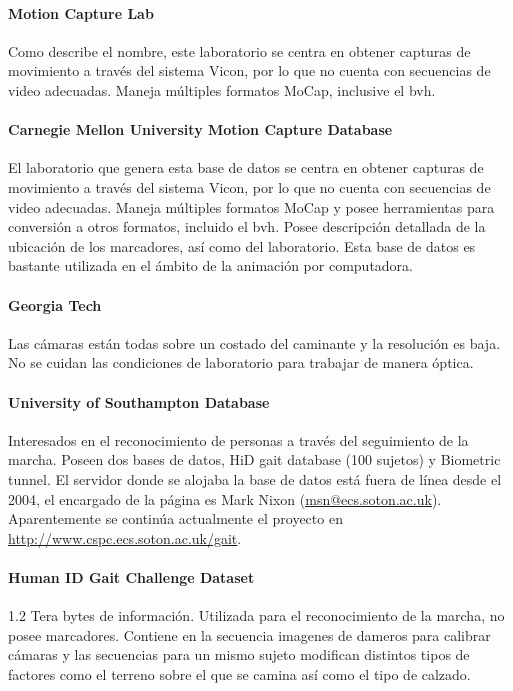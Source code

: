 \paragraph{Motion Capture Lab}
	Como describe el nombre, este laboratorio se centra en obtener capturas de movimiento a través del sistema Vicon, por lo que no cuenta con secuencias de video adecuadas. Maneja múltiples formatos MoCap, inclusive el bvh.



\paragraph{Carnegie Mellon University Motion Capture Database}
 El laboratorio que genera esta base de datos se centra en obtener capturas de movimiento a través del sistema Vicon, por lo que no cuenta con secuencias de video adecuadas. Maneja múltiples formatos MoCap y  posee herramientas para conversión a otros formatos, incluido el bvh. Posee descripción detallada de la ubicación de los marcadores, así como del laboratorio. Esta base de datos es bastante utilizada en el ámbito de la  animación por computadora.

\paragraph{Georgia Tech}
Las cámaras están todas sobre un costado del caminante y la resolución es baja. No se cuidan las condiciones de laboratorio para trabajar de manera óptica.


\paragraph{University of Southampton Database}
Interesados en el reconocimiento de personas a través del seguimiento de la marcha. Poseen dos bases de datos, HiD gait database  (100 sujetos) y Biometric tunnel. El servidor donde se alojaba la base de datos está fuera de línea desde el 2004, el encargado de la página es Mark Nixon (\textcolor{blue}{\underline{\url{msn@ecs.soton.ac.uk}}}). Aparentemente se continúa actualmente el proyecto en \textcolor{blue}{\underline{\url{http://www.cspc.ecs.soton.ac.uk/gait}}}.  

\paragraph{Human ID Gait Challenge Dataset}
1.2 Tera bytes de información. Utilizada para el reconocimiento de la marcha,  no posee marcadores. Contiene en la secuencia imagenes de dameros para calibrar cámaras y las secuencias para un mismo sujeto modifican distintos tipos de factores como el terreno sobre el que se camina así como el tipo de calzado.

